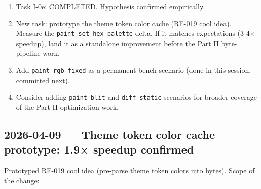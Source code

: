\begin{enumerate}
\def\labelenumi{\arabic{enumi}.}
\tightlist
\item
  Task I-0e: COMPLETED. Hypothesis confirmed empirically.
\item
  New task: prototype the theme token color cache (RE-019 cool idea). Measure the \texttt{p\allowbreak{}a\allowbreak{}i\allowbreak{}n\allowbreak{}t\allowbreak{}-\allowbreak{}s\allowbreak{}e\allowbreak{}t\allowbreak{}-\allowbreak{}h\allowbreak{}e\allowbreak{}x\allowbreak{}-\allowbreak{}p\allowbreak{}a\allowbreak{}l\allowbreak{}e\allowbreak{}t\allowbreak{}t\allowbreak{}e} delta. If it matches expectations (3-4× speedup), land it as a standalone improvement before the Part II byte-pipeline work.
\item
  Add \texttt{p\allowbreak{}a\allowbreak{}i\allowbreak{}n\allowbreak{}t\allowbreak{}-\allowbreak{}r\allowbreak{}g\allowbreak{}b\allowbreak{}-\allowbreak{}f\allowbreak{}i\allowbreak{}x\allowbreak{}e\allowbreak{}d} as a permanent bench scenario (done in this session, committed next).
\item
  Consider adding \texttt{p\allowbreak{}a\allowbreak{}i\allowbreak{}n\allowbreak{}t\allowbreak{}-\allowbreak{}b\allowbreak{}l\allowbreak{}i\allowbreak{}t} and \texttt{d\allowbreak{}i\allowbreak{}f\allowbreak{}f\allowbreak{}-\allowbreak{}s\allowbreak{}t\allowbreak{}a\allowbreak{}t\allowbreak{}i\allowbreak{}c} scenarios for broader coverage of the Part II optimization work.
\end{enumerate}

\subsection{2026-04-09 --- Theme token color cache prototype: 1.9× speedup confirmed}\label{record-422-theme-token-color-cache-prototype-1.9-speedup-confirmed}

Prototyped RE-019 cool idea (pre-parse theme token colors into bytes). Scope of the change:

